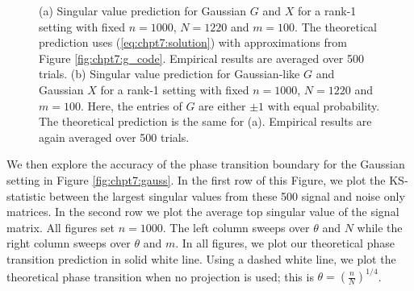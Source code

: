 \begin{figure}
  \begin{center}
    \caption{(a) Singular value prediction for Gaussian $G$ and $X$ for a rank-1 setting
      with fixed $n=1000$, $N=1220$ and $m=100$. The theoretical prediction uses
      (\ref{eq:chpt7:solution}) with approximations from Figure
      \ref{fig:chpt7:g_code}. Empirical results are averaged over 500 trials. (b) Singular
      value prediction for Gaussian-like $G$ and Gaussian $X$ for a rank-1 setting with
      fixed $n=1000$, $N=1220$ and $m=100$. Here, the entries of $G$ are either
      $\pm 1$ with equal probability. The theoretical prediction is the same for
      (a). Empirical results are again averaged over 500 trials.}
    \label{fig:chpt7:gauss_sv}
  \end{center}
\end{figure}

We then explore the accuracy of the phase transition boundary for the Gaussian setting in
Figure \ref{fig:chpt7:gauss}. In the first row of this Figure, we plot the KS-statistic
between the largest singular values from these 500 signal and noise only matrices. In the
second row we plot the average top singular value of the signal matrix. All figures set
$n=1000$. The left column sweeps over $\theta$ and $N$ while the right column sweeps over
$\theta$ and $m$. In all figures, we plot our theoretical phase transition prediction in
solid white line. Using a dashed white line, we plot the theoretical phase transition when
no projection is used; this is $\theta=\left(\frac{n}{N}\right)^{1/4}$.

